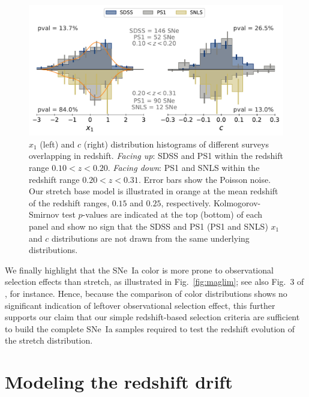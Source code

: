 \documentclass[]{aa}
\begin{document}
\begin{figure}
    \centering
    \includegraphics[width=0.95\linewidth]{Article_figures/both-cut_SDSS_SNLS_PS1.pdf}
    \caption{$x_1$ (left) and $c$ (right) distribution histograms of
            different surveys overlapping in redshift. \textit{Facing up}: SDSS
            and PS1 within the redshift range $0.10 < z < 0.20$. \textit{Facing
            down}: PS1 and SNLS within the redshift range $0.20 < z < 0.31$.
            Error bars show the Poisson noise. Our stretch base model is
            illustrated in orange at the mean redshift of the redshift ranges,
            $0.15$ and $0.25$, respectively. Kolmogorov-Smirnov test $p$-values
            are indicated at the top (bottom) of each panel and show no
            sign that the SDSS and PS1 (PS1 and SNLS) $x_1$ and $c$
            distributions are not drawn from the same underlying
    distributions.}
    \label{fig:distrib}
\end{figure}

We finally highlight that the SNe~Ia color is more prone to
    observational selection effects than stretch, as illustrated in
    Fig.~\ref{fig:maglim}; see also Fig.~3 of \cite{kessler2017}, for instance. Hence,
    because the comparison of color distributions shows no significant indication of
    leftover observational selection effect, this further supports our claim that
    our simple redshift-based selection criteria are sufficient to build the
    complete SNe~Ia samples required to test the redshift evolution of the
stretch distribution.

\section{Modeling the redshift drift}\label{sec:modeling}
\end{document}
